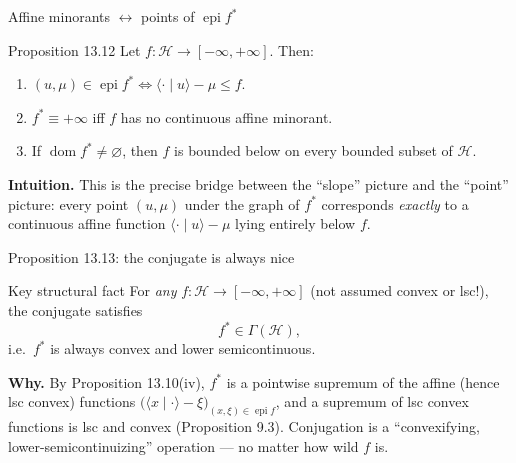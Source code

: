 \documentclass[aspectratio=169,10pt]{beamer}
\newcommand{\Hil}{\mathcal{H}}
\newcommand{\inner}[2]{\langle #1 \mid #2 \rangle}
\newcommand{\dom}{\operatorname{dom}}
\newcommand{\epi}{\operatorname{epi}}
\newcommand{\Gammabig}{\Gamma(\Hil)}
\newcommand{\conj}[1]{#1^{*}}
\begin{document}
\begin{frame}{Affine minorants $\leftrightarrow$ points of $\epi \conj f$}
  \begin{block}{Proposition 13.12}
    Let $f:\Hil\to[-\infty,+\infty]$. Then:
    \begin{enumerate}
      \item[(i)] $(u,\mu)\in\epi \conj f \iff \inner{\cdot}{u}-\mu \le f$.
      \item[(ii)] $\conj f\equiv+\infty$ iff $f$ has no continuous affine
        minorant.
      \item[(iii)] If $\dom\conj f\ne\varnothing$, then $f$ is bounded
        below on every bounded subset of $\Hil$.
    \end{enumerate}
  \end{block}
  \textbf{Intuition.} This is the precise bridge between the ``slope''
  picture and the ``point'' picture: every point $(u,\mu)$ under the graph
  of $\conj f$ corresponds \emph{exactly} to a continuous affine function
  $\inner\cdot u - \mu$ lying entirely below $f$.
\end{frame}

\begin{frame}{Proposition 13.13: the conjugate is always nice}
  \begin{alertblock}{Key structural fact}
    For \emph{any} $f:\Hil\to[-\infty,+\infty]$ (not assumed convex or
    lsc!), the conjugate satisfies
    \[
      \conj f \in \Gammabig,
    \]
    i.e.\ $\conj f$ is always convex and lower semicontinuous.
  \end{alertblock}
  \textbf{Why.} By Proposition 13.10(iv), $\conj f$ is a pointwise supremum
  of the affine (hence lsc convex) functions
  $\big(\inner{x}{\cdot}-\xi\big)_{(x,\xi)\in\epi f}$, and a supremum of lsc
  convex functions is lsc and convex (Proposition 9.3). Conjugation is a
  ``convexifying, lower-semicontinuizing'' operation --- no matter how wild
  $f$ is.
\end{frame}
\end{document}
